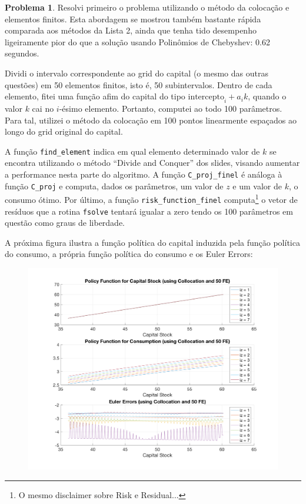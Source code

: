 \documentclass[11pt]{article}
\theoremstyle{definition}
\newtheorem{prob}{Problema}
\theoremstyle{solution}
\begin{document}
\FloatBarrier
\begin{prob}
	Resolvi primeiro o problema utilizando o método da colocação e elementos finitos. Esta abordagem se mostrou também bastante rápida comparada aos métodos da Lista 2, ainda que tenha tido desempenho ligeiramente pior do que a solução usando Polinômios de Chebyshev: 0.62 segundos.
	
	Dividi o intervalo correspondente ao grid do capital (o mesmo das outras questões) em 50 elementos finitos, isto é, 50 subintervalos. Dentro de cada elemento, fitei uma função afim do capital do tipo $\text{intercepto}_{i} + a_{i}k$, quando o valor $k$ cai no $i$-ésimo elemento. Portanto, computei ao todo 100 parâmetros. Para tal, utilizei o método da colocação em 100 pontos linearmente espaçados ao longo do grid original do capital.
	
	A função \texttt{find\_element} indica em qual elemento determinado valor de $k$ se encontra utilizando o método ``Divide and Conquer'' dos slides, visando aumentar a performance nesta parte do algoritmo. A função \texttt{C\_proj\_finel} é análoga à função \texttt{C\_proj} e computa, dados os parâmetros, um valor de $z$ e um valor de $k$, o consumo ótimo. Por último, a função \texttt{risk\_function\_finel} computa\footnote{O mesmo disclaimer sobre Risk e Residual...} o vetor de resíduos que a rotina \texttt{fsolve} tentará igualar a zero tendo os 100 parâmetros em questão como graus de liberdade.
	
	A próxima figura ilustra a função política do capital induzida pela função política do consumo, a própria função política do consumo e os Euler Errors:
	\begin{figure}[h!]
		\centering
		\includegraphics[scale = 0.25]{finel}
	\end{figure}
	

\end{prob}
\end{document}
